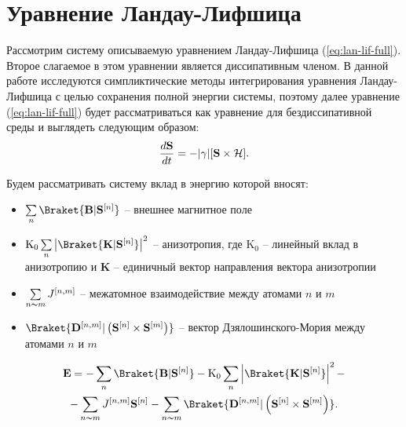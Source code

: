 \section{Уравнение Ландау-Лифшица}
Рассмотрим систему описываемую уравнением Ландау-Лифшица
(\ref{eq:lan-lif-full}).
Второе слагаемое в этом уравнении является диссипативным членом.
В данной работе исследуются симпликтические методы интегрирования уравнения
Ландау-Лифшица с целью сохранения полной энергии системы, поэтому далее
уравнение (\ref{eq:lan-lif-full}) будет рассматриваться как уравнение для
бездиссипативной среды и выглядеть следующим образом:
\begin{equation}\label{eq:lan-lif}
	\frac{d \mathbf S}{d t} = - |\gamma|[\mathbf S\times \mathcal{H}].
\end{equation}

Будем рассматривать систему вклад в энергию которой вносят:
\begin{itemize}
    \item $\sum\limits_n \Braket{\mathbf B | \Sn}$ -- внешнее магнитное поле
    \item $\mathrm{K_0} \sum\limits_n \left| \Braket{\mathbf K | \Sn }
        \right|^2 $
        -- анизотропия, где $\mathrm{K_0}$ -- линейный вклад в анизотропию и
        $\mathbf K$ -- единичный вектор направления вектора анизотропии
    \item $\sum\limits_{n\thicksim m} J^{[n,m]}$ -- межатомное взаимодействие
        между атомами $n$ и $m$
    \item $\Braket{\mathbf D^{[n,m]} | \left(\Sn \times
        \mathbf S^{[m]}\right) }$ -- вектор Дзялошинского-Мория между атомами
        $n$ и $m$
\end{itemize}
\begin{multline}
    \mathbf E = -\sum_n \Braket{\mathbf B | \Sn} - \mathrm{K_0} \sum_n
    \left| \Braket{\mathbf K | \Sn } \right|^2
    -\\-
    \sum_{n\thicksim m} J^{[n,m]} \Sn - \sum_{n\thicksim m}
    \Braket{\mathbf D^{[n,m]} | \left(\Sn \times \mathbf S^{[m]}\right)}.
\end{multline}

